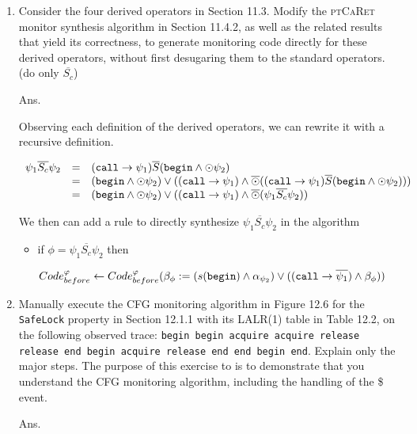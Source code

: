 \documentclass{article}
\begin{document}
\begin{enumerate}
\item Consider the four derived operators in Section 11.3.
Modify the \textsc{ptCaRet} monitor synthesis algorithm in Section 11.4.2,
as well as the related results that yield its correctness,
to generate monitoring code directly for these derived operators,
without first desugaring them to the standard operators.
(do only $\overline{S_c}$)

Ans.

Observing each definition of the derived operators,
we can rewrite it with a recursive definition.

\newcommand{\Sc}{\ensuremath{\overline{S_c}}\xspace}

$$
\begin{array}{lll}
	\psi_1\Sc\psi_2 & = & (\CALL \to \psi_1)\ASince (\BEGIN \land \Prev \psi_2)                                                      \\
	                & = & (\BEGIN\land\Prev\psi_2)\lor((\CALL\to\psi_1)\land\APrev((\CALL\to\psi_1)\ASince(\BEGIN\land\Prev\psi_2))) \\
	                & = & (\BEGIN\land\Prev\psi_2)\lor((\CALL\to\psi_1)\land\APrev(\psi_1\Sc\psi_2))
\end{array}
$$

We then can add a rule to directly synthesize $\psi_1 \Sc \psi_2$ in the algorithm
\begin{itemize}
	\item if $\phi = \psi_1\Sc\psi_2$ then
	
	$Code^\varphi_{before}\leftarrow Code^{\varphi}_{before}
	(\beta_\phi := (s(\texttt{begin})\land\alpha_{\psi_2})\lor((\texttt{call}\to\overline{\psi_1})\land\beta_\phi))$
\end{itemize}

\item\label{p3} Manually execute the CFG monitoring algorithm in Figure 12.6 for the
\texttt{SafeLock} property in Section 12.1.1 with its LALR(1) table in Table 12.2,
on the following observed trace:
\texttt{begin begin acquire acquire release release end begin acquire release end
end begin end}.
Explain only the major steps.
The purpose of this exercise to is to demonstrate that you understand the CFG
monitoring algorithm, including the handling of the \$ event.

Ans.

\newcommand{\ACQ}{\texttt{acquire}\xspace}
\newcommand{\REL}{\texttt{release}\xspace}
\newcommand{\REDUCE}{\ensuremath{reduce}}
\newcommand{\SHIFT}{\ensuremath{shift}}


\end{enumerate}
\end{document}
